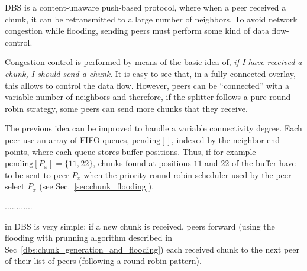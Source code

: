 
\label{sec:congestion_control}

DBS is a content-unaware push-based protocol, where when a peer
received a chunk, it can be retransmitted to a large number of
neighbors. To avoid network congestion while flooding, sending peers
must perform some kind of data flow-control.


Congestion control is performed by means of the basic idea of, {\sl if
  I have received a chunk, I should send a chunk}. It is easy to see
that, in a fully connected overlay, this allows to control the data
flow. However, peers can be ``connected'' with a variable number of
neighbors and therefore, if the splitter follows a pure round-robin
strategy, some peers can send more chunks that they receive.

The previous idea can be improved to handle a variable connectivity
degree. Each peer use an array of FIFO queues, $\text{pending}[]$,
indexed by the neighbor end-points, where each queue stores buffer
positions. Thus, if for example $\text{pending}[P_x]=\{11,22\}$,
chunks found at positions $11$ and $22$ of the buffer have to be sent
to peer $P_x$ when the priority round-robin scheduler used by the peer
select $P_x$ (see Sec.~\ref{sec:chunk_flooding}).


............

in DBS is very simple: if a new chunk is
received, peers forward (using the flooding with prunning algorithm
described in Sec~\ref{dbs:chunk_generation_and_flooding}) each
received chunk to the next peer of their list of peers (following a
round-robin pattern).


